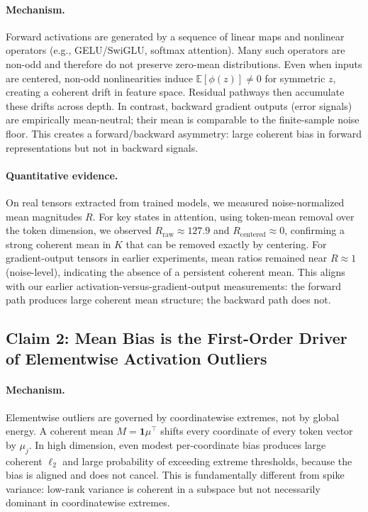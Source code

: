 \paragraph{Mechanism.}
Forward activations are generated by a sequence of linear maps and nonlinear operators (e.g., GELU/SwiGLU, softmax attention). Many such operators are non-odd and therefore do not preserve zero-mean distributions. Even when inputs are centered, non-odd nonlinearities induce $\mathbb{E}[\phi(z)]\neq 0$ for symmetric $z$, creating a coherent drift in feature space. Residual pathways then accumulate these drifts across depth. In contrast, backward gradient outputs (error signals) are empirically mean-neutral; their mean is comparable to the finite-sample noise floor. This creates a forward/backward asymmetry: large coherent bias in forward representations but not in backward signals.

\paragraph{Quantitative evidence.}
On real tensors extracted from trained models, we measured noise-normalized mean magnitudes $R$. For key states in attention, using token-mean removal over the token dimension, we observed $R_{\text{raw}}\approx 127.9$ and $R_{\text{centered}}\approx 0$, confirming a strong coherent mean in $K$ that can be removed exactly by centering. For gradient-output tensors in earlier experiments, mean ratios remained near $R\approx 1$ (noise-level), indicating the absence of a persistent coherent mean. This aligns with our earlier activation-versus-gradient-output measurements: the forward path produces large coherent mean structure; the backward path does not.

\subsection{Claim 2: Mean Bias is the First-Order Driver of Elementwise Activation Outliers}

\paragraph{Mechanism.}
Elementwise outliers are governed by coordinatewise extremes, not by global energy. A coherent mean $M=\mathbf{1}\mu^\top$ shifts every coordinate of every token vector by $\mu_j$. In high dimension, even modest per-coordinate bias produces large coherent $\ell_2$ and large probability of exceeding extreme thresholds, because the bias is aligned and does not cancel. This is fundamentally different from spike variance: low-rank variance is coherent in a subspace but not necessarily dominant in coordinatewise extremes.

